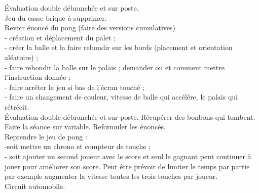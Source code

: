 \documentclass[12pt,a4paper]{article} %
\begin{document}
Évaluation double débranchée et sur poste. \\
Jeu du casse brique à supprimer. \\
Revoir énoncé du pong (faire des versions cumulatives) \\
- création et déplacement du palet ; \\
- créer la balle et la faire rebondir sur les bords (placement et orientation aléatoire) ; \\
- faire rebondir la balle sur le palais ; demander ou et comment mettre l'instruction donnée ; \\
- faire arrêter le jeu si bas de l'écran touché ; \\
- faire un changement de couleur, vitesse de balle qui accélère, le palais qui rétrécit. \\
Évaluation double débranchée et sur poste. Récupérer des bonbons qui tombent. \\
Faire la séance sur variable. Reformuler les énoncés. \\
Reprendre le jeu de pong : \\
-soit mettre un chrono et compteur de touche ; \\
- soit ajouter un second joueur avec le score et seul le gagnant peut continuer à jouer pour améliorer son score. Peut être prévoir de limiter le temps par partie par exemple augmenter la vitesse toutes les trois touches par joueur. \\
Circuit automobile. \\
\end{document}
